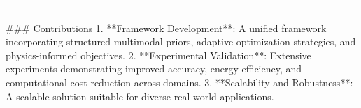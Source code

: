 ---

### Contributions  
1. **Framework Development**: A unified framework incorporating structured multimodal priors, adaptive optimization strategies, and physics-informed objectives.  
2. **Experimental Validation**: Extensive experiments demonstrating improved accuracy, energy efficiency, and computational cost reduction across domains.  
3. **Scalability and Robustness**: A scalable solution suitable for diverse real-world applications.  

